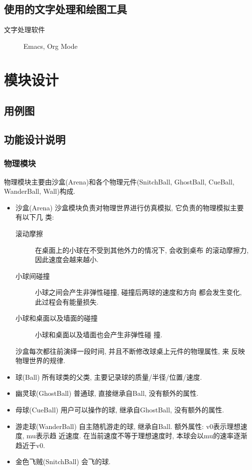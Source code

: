 \documentclass[11pt]{article}
\begin{document}
\subsection*{使用的文字处理和绘图工具}
\label{sec-1-4}
\begin{description}
\item[{文字处理软件}] Emacs, Org Mode
\end{description}
\section*{模块设计}
\label{sec-2}
\subsection*{用例图}
\label{sec-2-1}
\subsection*{功能设计说明}
\label{sec-2-2}
\subsubsection*{物理模块}
\label{sec-2-2-1}
物理模块主要由沙盒(Arena)和各个物理元件(SnitchBall, GhostBall,
CueBall, WanderBall, Wall)构成. 
\begin{itemize}
\item 沙盒(Arena)
\label{sec-2-2-1-1}
沙盒模块负责对物理世界进行仿真模拟, 它负责的物理模拟主要有以下几
类:
\begin{description}
\item[{滚动摩擦}] 在桌面上的小球在不受到其他外力的情况下, 会收到桌布
的滚动摩擦力, 因此速度会越来越小.
\item[{小球间碰撞}] 小球之间会产生非弹性碰撞, 碰撞后两球的速度和方向
都会发生变化, 此过程会有能量损失.
\item[{小球和桌面以及墙面的碰撞}] 小球和桌面以及墙面也会产生非弹性碰
撞.
\end{description}

沙盒每次都往前演绎一段时间, 并且不断修改球桌上元件的物理属性, 来
反映物理世界的规律.
\item 球(Ball)
\label{sec-2-2-1-2}
所有球类的父类, 主要记录球的质量/半径/位置/速度.
\item 幽灵球(GhostBall)
\label{sec-2-2-1-3}
普通球, 直接继承自Ball, 没有额外的属性. 
\item 母球(CueBall)
\label{sec-2-2-1-4}
用户可以操作的球, 继承自GhostBall, 没有额外的属性.
\item 游走球(WanderBall)
\label{sec-2-2-1-5}
自主随机游走的球, 继承自Ball. 额外属性: v0表示理想速度, mu表示趋
近速度. 在当前速度不等于理想速度时, 本球会以mu的速率逐渐趋近于v0.
\item 金色飞贼(SnitchBall)
\label{sec-2-2-1-6}
会飞的球.
\end{itemize}
\end{document}
